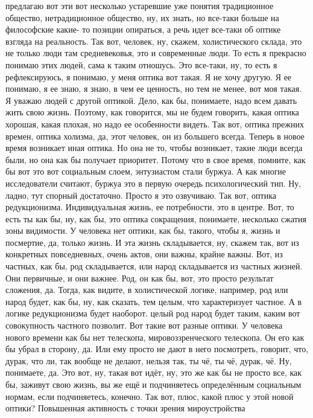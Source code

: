 предлагаю вот эти вот несколько устаревшие уже понятия традиционное общество,
нетрадиционное общество, ну, их знать, но все-таки больше на философские какие-
то позиции опираться, а речь идет все-таки об оптике взгляда на реальность. Так
вот, человек, ну, скажем, холистического склада, это не только люди там
средневековья, это и современные люди. То есть я прекрасно понимаю этих людей,
сама к таким отношусь. Это все-таки, ну, то есть я рефлексируюсь, я понимаю, у
меня оптика вот такая. Я не хочу другую. Я ее понимаю, я ее знаю, я знаю, в чем
ее ценность, но тем не менее, вот моя такая. Я уважаю людей с другой оптикой.
Дело, как бы, понимаете, надо всем давать жить свою жизнь. Поэтому, как
говорится, мы не будем говорить, какая оптика хорошая, какая плохая, но надо ее
особенности видеть. Так вот, оптика прежних времен, оптика холизма, да, этот
человек, он из большего всегда. Теперь в новое время возникает иная оптика. Но
она не то, чтобы возникает, такие люди всегда были, но она как бы получает
приоритет. Потому что в свое время, помните, как бы вот это вот социальным
слоем, энтузиастом стали буржуа. А как многие исследователи считают, буржуа это
в первую очередь психологический тип. Ну, ладно, тут спорный достаточно. Просто
я это озвучиваю. Так вот, оптика редукционизма. Индивидуальная жизнь, ее
потребности, это в центре. Вот, то есть ты как бы, ну, как бы, это оптика
сокращения, понимаете, несколько сжатия зоны видимости. У человека нет оптики,
как бы, такого, чтобы я, жизнь и посмертие, да, только жизнь. И эта жизнь
складывается, ну, скажем так, вот из конкретных повседневных, очень актов, они
важны, крайне важны. Вот, из частных, как бы, род складывается, или народ
складывается из частных жизней. Они первичные, и они важнее. Род, он как бы,
вот, это просто результат сложения, да. Тогда, как видите, в холистической
логике, например, род или народ будет, как бы, ну, как сказать, тем целым, что
характеризует частное. А в логике редукционизма будет наоборот. целый род народ
будет таким, каким вот совокупность частного позволит. Вот такие вот разные
оптики. У человека нового времени как бы нет телескопа, мировоззренческого
телескопа. Он его как бы убрал в сторону, да. Или ему просто не дают в него
посмотреть, говорит, что, дурак, что ли, так вообще не делают, нельзя так, ты
чё, ты чё, дурак, чё. Ну, понимаете, да. Это вот, ну, такая вот идёт, ну, это же
как бы не просто все, как бы, заживут свою жизнь, вы же ещё и подчиняетесь
определённым социальным нормам, если подчиняетесь, конечно. Так вот, плюс, какой
плюс у этой новой оптики? Повышенная активность с точки зрения мироустройства
